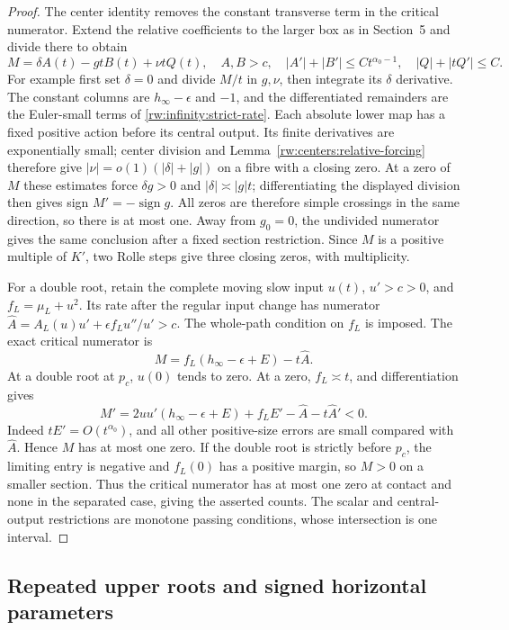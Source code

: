 \begin{proof}
The center identity removes the constant transverse term in the
critical numerator. Extend the relative coefficients to the larger
box as in Section~5 and divide there to obtain
\[
 M=\delta A(t)-gtB(t)+\nu tQ(t),\quad A,B>c,
 \quad |A'|+|B'|\le Ct^{\alpha_0-1},
 \quad |Q|+|tQ'|\le C.
\]
For example first set $\delta=0$ and divide $M/t$ in $g,\nu$,
then integrate its $\delta$ derivative. The constant columns are
$h_\infty-\epsilon$ and $-1$, and the differentiated remainders
are the Euler-small terms of \eqref{rw:infinity:strict-rate}.
Each absolute lower map has a fixed positive action before its
central output. Its finite derivatives are exponentially small;
center division and Lemma~\ref{rw:centers:relative-forcing} therefore
give $|\nu|=o(1)(|\delta|+|g|)$ on a fibre with a closing zero.
At a zero of $M$ these estimates force
$\delta g>0$ and $|\delta|\asymp|g|t$; differentiating the
displayed division then gives sign $M'=-\operatorname{sign}g$.
All zeros are therefore simple crossings in the same direction, so
there is at most one. Away from $g_0=0$, the undivided numerator
gives the same conclusion after a fixed section restriction.
Since $M$ is a positive multiple of $K'$, two Rolle steps give
three closing zeros, with multiplicity.

For a double root, retain the complete moving slow input $u(t)$,
$u'>c>0$, and $f_L=\mu_L+u^2$. Its rate after the regular input
change has numerator
$\widehat A=A_L(u)u'+\epsilon f_Lu''/u'>c$.
The whole-path condition on $f_L$ is imposed. The exact critical
numerator is
\[
 M=f_L(h_\infty-\epsilon+E)-t\widehat A.
\]
At a double root at $p_c$, $u(0)$ tends to zero. At a zero,
$f_L\asymp t$, and differentiation gives
\[
 M'=2uu'(h_\infty-\epsilon+E)+f_LE'
                      -\widehat A-t\widehat A'<0.
\]
Indeed $tE'=O(t^{\alpha_0})$, and all other positive-size errors
are small compared with $\widehat A$. Hence $M$ has at most one
zero. If the double root is strictly before $p_c$, the limiting
entry is negative and $f_L(0)$ has a positive margin, so $M>0$
on a smaller section. Thus the critical numerator has at most one zero
at contact and none in the separated case, giving the asserted counts. The scalar and
central-output restrictions are monotone passing conditions, whose
intersection is one interval.
\end{proof}

\subsection{Repeated upper roots and signed horizontal parameters}

